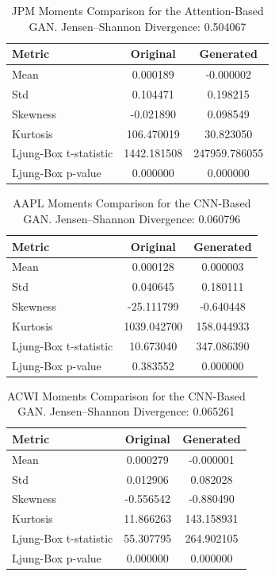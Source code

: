 \documentclass{article}
\begin{document}
\begin{table}[ht]
\centering
\begin{tabular}{lcc}
\hline
\textbf{Metric} & \textbf{Original} & \textbf{Generated} \\
\hline
Mean     & 0.000189 & -0.000002 \\
Std      & 0.104471 & 0.198215 \\
Skewness & -0.021890 & 0.098549 \\
Kurtosis & 106.470019 & 30.823050 \\
Ljung-Box t-statistic & 1442.181508 & 247959.786055 \\
Ljung-Box p-value & 0.000000 & 0.000000 \\
\hline
\end{tabular}
\caption{JPM Moments Comparison for the Attention-Based GAN.
Jensen--Shannon Divergence: 0.504067}
\label{tab:jpm_attention}
\end{table}

\begin{table}[h!]
\centering
\begin{tabular}{lcc}
\hline
\textbf{Metric} & \textbf{Original} & \textbf{Generated} \\
\hline
Mean     & 0.000128 & 0.000003 \\
Std      & 0.040645 & 0.180111 \\
Skewness & -25.111799 & -0.640448 \\
Kurtosis & 1039.042700 & 158.044933 \\
Ljung-Box t-statistic & 10.673040 & 347.086390 \\
Ljung-Box p-value & 0.383552 & 0.000000 \\
\hline
\end{tabular}
\caption{AAPL Moments Comparison for the CNN-Based GAN.
Jensen--Shannon Divergence: 0.060796}
\label{tab:aapl_cnn}
\end{table}

\begin{table}[h!]
\centering
\begin{tabular}{lcc}
\hline
\textbf{Metric} & \textbf{Original} & \textbf{Generated} \\
\hline
Mean     & 0.000279 & -0.000001 \\
Std      & 0.012906 & 0.082028 \\
Skewness & -0.556542 & -0.880490 \\
Kurtosis & 11.866263 & 143.158931 \\
Ljung-Box t-statistic & 55.307795 & 264.902105 \\
Ljung-Box p-value & 0.000000 & 0.000000 \\
\hline
\end{tabular}
\caption{ACWI Moments Comparison for the CNN-Based GAN.
Jensen--Shannon Divergence: 0.065261}
\label{tab:acwi_cnn}
\end{table}
\end{document}
